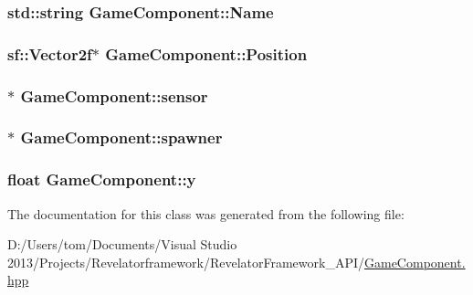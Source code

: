 \hypertarget{class_game_component_ab1037207fec65ac5fe65dec1e22f0566}{
\subsubsection[{Name}]{\setlength{\rightskip}{0pt plus 5cm}std\-::string Game\-Component\-::\-Name\hspace{0.3cm}{\ttfamily [protected]}}}\label{class_game_component_ab1037207fec65ac5fe65dec1e22f0566}
\hypertarget{class_game_component_acc3109bb4ae36112eb8796e067160c59}{
\subsubsection[{Position}]{\setlength{\rightskip}{0pt plus 5cm}sf\-::\-Vector2f$\ast$ Game\-Component\-::\-Position\hspace{0.3cm}{\ttfamily [protected]}}}\label{class_game_component_acc3109bb4ae36112eb8796e067160c59}
\hypertarget{class_game_component_ad585bf57df228afc83fbf777142e51bd}{
\subsubsection[{sensor}]{$\ast$ Game\-Component\-::sensor\hspace{0.3cm}{\ttfamily [protected]}}}\label{class_game_component_ad585bf57df228afc83fbf777142e51bd}
\hypertarget{class_game_component_a15caaab21ec2e8eb9d438a25afbef4da}{
\subsubsection[{spawner}]{$\ast$ Game\-Component\-::spawner\hspace{0.3cm}{\ttfamily [protected]}}}\label{class_game_component_a15caaab21ec2e8eb9d438a25afbef4da}
\hypertarget{class_game_component_a8a40aa75eff388a7da06668d3d2fe87c}{
\subsubsection[{y}]{\setlength{\rightskip}{0pt plus 5cm}float Game\-Component\-::y}}\label{class_game_component_a8a40aa75eff388a7da06668d3d2fe87c}


The documentation for this class was generated from the following file\-:\begin{DoxyCompactItemize}
\item 
D\-:/\-Users/tom/\-Documents/\-Visual Studio 2013/\-Projects/\-Revelatorframework/\-Revelator\-Framework\-\_\-\-A\-P\-I/\hyperlink{_game_component_8hpp}{Game\-Component.\-hpp}\end{DoxyCompactItemize}
